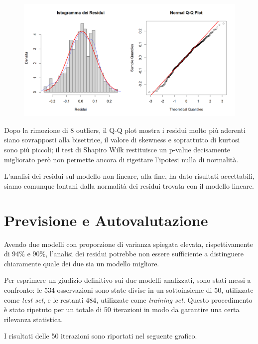 \documentclass[11pt,a4paper]{article}
\begin{document}
\begin{figure}[h]
    \hspace{-1.5cm}
	\includegraphics[scale=0.75]{imgs/residuals_analysis_log_model_after_outliers_removals.png}
    \end{figure}
\vspace{-0.4cm}

Dopo la rimozione di 8 outliers, il Q-Q plot mostra i residui molto più aderenti siano sovrapposti alla bisettrice, il valore di skewness e soprattutto di kurtosi sono più piccoli;
il test di Shapiro Wilk restituisce un p-value decisamente migliorato però non permette ancora di rigettare l'ipotesi nulla di normalità.

L'analisi dei residui sul modello non lineare, alla fine, ha dato risultati accettabili, siamo comunque lontani dalla normalità dei residui trovata con il modello lineare.

\section{Previsione e Autovalutazione}
Avendo due modelli con proporzione di varianza spiegata elevata, rispettivamente di 94\% e 90\%, l'analisi dei residui potrebbe non essere sufficiente a distinguere chiaramente quale dei due sia un modello migliore.

Per esprimere un giudizio definitivo sui due modelli analizzati, sono stati messi a confronto: le 534 osservazioni sono state divise in un sottoinsieme di 50, utilizzate come \emph{test set}, e le restanti 484, utilizzate come \emph{training set}.
Questo procedimento è stato ripetuto per un totale di 50 iterazioni in modo da garantire una certa rilevanza statistica.

I risultati delle 50 iterazioni sono riportati nel seguente grafico.
\end{document}
